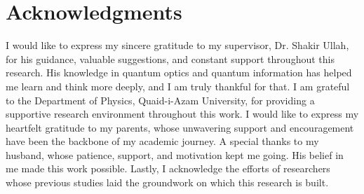 \documentclass[12pt,a4paper]{report}
\begin{document}
\setcounter{page}{8}
\newpage

\chapter*{Acknowledgments}
I would like to express my sincere gratitude to my supervisor, Dr. Shakir Ullah, for his guidance, valuable suggestions, and constant support throughout this research. His knowledge in quantum optics and quantum information has helped me learn and think more deeply, and I am truly thankful for that.
I am grateful to the Department of Physics, Quaid-i-Azam University, for providing a supportive research environment throughout this work.
I would like to express my heartfelt gratitude to my parents, whose unwavering support and encouragement have been the backbone of my academic journey.
A special thanks to my husband, whose patience, support, and motivation kept me going. His belief in me made this work possible.
Lastly, I acknowledge the efforts of researchers whose previous studies laid the groundwork on which this research is built.
\end{document}
